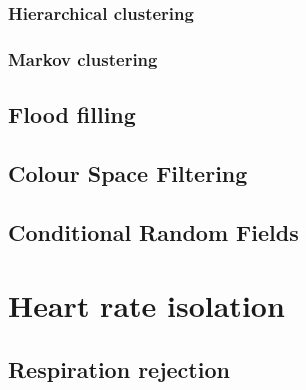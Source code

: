 \subsubsection{Hierarchical clustering}
\subsubsection{Markov clustering}

\subsection{}
\subsection{Flood filling}
\subsection{Colour Space Filtering}
\subsection{Conditional Random Fields}


\section{Heart rate isolation}
\subsection{Respiration rejection}

